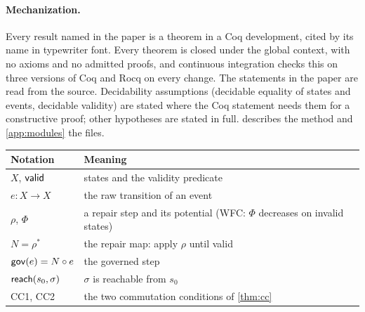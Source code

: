 \paragraph{Mechanization.} Every result named in the paper is a theorem in a Coq development, cited by its
name in typewriter font. Every theorem is closed under the global context, with no axioms and no
admitted proofs, and continuous integration checks this on three versions of Coq and Rocq on every change. The
statements in the paper are read from the source. Decidability assumptions (decidable equality of
states and events, decidable validity) are stated where the Coq statement needs them for a
constructive proof; other hypotheses are stated in full.  describes the method and
\cref{app:modules} the files.

\begin{center}\small
\begin{tabular}{@{}ll@{}}
\toprule
Notation & Meaning \\
\midrule
$X$, $\mathsf{valid}$ & states and the validity predicate \\
$e : X \to X$ & the raw transition of an event \\
$\rho$, $\Phi$ & a repair step and its potential (WFC: $\Phi$ decreases on invalid states) \\
$N = \rho^{*}$ & the repair map: apply $\rho$ until valid \\
$\mathsf{gov}(e) = N \circ e$ & the governed step \\
$\mathsf{reach}(s_0, \sigma)$ & $\sigma$ is reachable from $s_0$ \\
CC1, CC2 & the two commutation conditions of \cref{thm:cc} \\
\bottomrule
\end{tabular}
\end{center}
